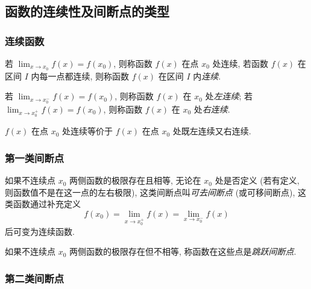 \subsection{函数的连续性及间断点的类型}

\subsubsection{连续函数}

\begin{definition}[函数连续]
    若 $\displaystyle\lim_{x\to x_0}f(x)=f(x_0)$, 则称函数 $f(x)$ 在点 $x_0$ 处连续, 若函数 $f(x)$ 在区间 $ I $ 内每一点都连续, 则称函数 $f(x)$ 在区间 $I$ 内\textit{连续}.
\end{definition}

\begin{definition}[单侧连续]
    若 $\displaystyle\lim_{x\to x_0^-}f(x)=f(x_0)$, 则称函数 $f(x)$ 在 $x_0$ 处\textit{左连续}; 若 $\displaystyle\lim_{x\to x_0^+}f(x)=f(x_0)$, 则称函数 $f(x)$ 在 $x_0$ 处\textit{右连续}.
\end{definition}

\begin{theorem}[函数连续的充要条件]
    $f(x)$ 在点 $x_0$ 处连续等价于 $f(x)$  在点 $x_0$ 处既左连续又右连续.
\end{theorem}

\subsubsection{第一类间断点}

\begin{definition}[可去间断点]
    如果不连续点 $ x_{0} $ 两侧函数的极限存在且相等, 无论在 $ x_{0} $ 处是否定义
    (若有定义, 则函数值不是在这一点的左右极限), 
    这类间断点叫\textit{可去间断点} (或可移间断点), 这类函数通过补充定义
    $$f\left(x_{0}\right)=\lim _{x \rightarrow x_{0}^{+}} f(x)=\lim _{x \rightarrow x_{0}^{-}} f(x)$$
    后可变为连续函数.
\end{definition}

\begin{definition}[跳跃间断点]
    如果不连续点 $x_{0}$ 两侧函数的极限存在但不相等, 称函数在这些点是\textit{跳跃间断点}.
\end{definition}

\subsubsection{第二类间断点}

